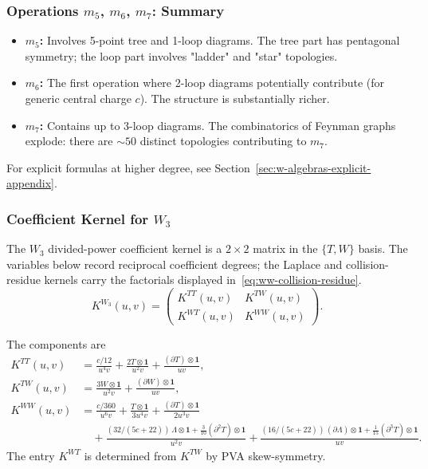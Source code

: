 \subsubsection{Operations $m_5$, $m_6$, $m_7$: Summary}

\begin{itemize}
\item \textbf{$m_5$:} Involves 5-point tree and 1-loop diagrams. The tree part has pentagonal symmetry; the loop part involves "ladder" and "star" topologies.

\item \textbf{$m_6$:} The first operation where 2-loop diagrams potentially contribute (for generic central charge $c$). The structure is substantially richer.

\item \textbf{$m_7$:} Contains up to 3-loop diagrams. The combinatorics of Feynman graphs explode: there are $\sim 50$ distinct topologies contributing to $m_7$.
\end{itemize}

For explicit formulas at higher degree, see Section~\ref{sec:w-algebras-explicit-appendix}.

\subsubsection{Coefficient Kernel for $W_3$}

The $W_3$ divided-power coefficient kernel is a $2 \times 2$ matrix in
the $\{T,W\}$ basis. The variables below record reciprocal
coefficient degrees; the Laplace and collision-residue kernels carry
the factorials displayed in~\eqref{eq:ww-collision-residue}.
\begin{equation}
K^{W_3}(u, v) = \begin{pmatrix}
K^{TT}(u,v) & K^{TW}(u,v) \\
K^{WT}(u,v) & K^{WW}(u,v)
\end{pmatrix}.
\end{equation}

The components are
\begin{align}
K^{TT}(u,v) &= \frac{c/12}{u^4 v} + \frac{2T \otimes \mathbf{1}}{u^2 v} + \frac{(\partial T) \otimes \mathbf{1}}{u v},\\
K^{TW}(u,v) &= \frac{3W \otimes \mathbf{1}}{u^2 v} + \frac{(\partial W) \otimes \mathbf{1}}{u v},\\
K^{WW}(u,v) &= \frac{c/360}{u^6 v} + \frac{T \otimes \mathbf{1}}{3u^4 v} + \frac{(\partial T) \otimes \mathbf{1}}{2u^3 v} \\
&\quad + \frac{(32/(5c+22))\,\Lambda \otimes \mathbf{1} + \tfrac{3}{10}(\partial^2 T) \otimes \mathbf{1}}{u^2 v} + \frac{(16/(5c+22))\,(\partial\Lambda) \otimes \mathbf{1} + \tfrac{1}{15}(\partial^3 T) \otimes \mathbf{1}}{u v}.
\end{align}
The entry $K^{WT}$ is determined from $K^{TW}$ by PVA
skew-symmetry.

